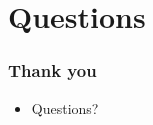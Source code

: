\section{Questions}

\begin{frame}
    \frametitle{Thank you}
    \begin{itemize}
        \item Questions?
    \end{itemize}
\end{frame}
